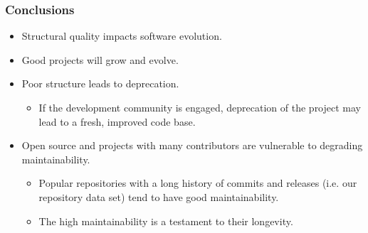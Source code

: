 \documentclass{beamer}
\begin{document}


\begin{frame}
  \frametitle{Conclusions}
  \begin{itemize}
    \item Structural quality impacts software evolution.
    
    \vspace{0.35cm}
    \item Good projects will grow and evolve.
    
    \vspace{0.35cm}
    \item Poor structure leads to deprecation.
    \begin{itemize}
      \item If the development community is engaged, deprecation of 
        \newline the project may lead to a fresh, improved code base.
    \end{itemize}
    
    \vspace{0.35cm}
    \item Open source and projects with many contributors are vulnerable to degrading maintainability.
    \begin{itemize}
      \item Popular repositories with a long history of commits and releases 
        \newline (i.e. our repository data set) tend to have good maintainability.
      \item The high maintainability is a testament to their longevity.
    \end{itemize}
  \end{itemize}
\end{frame}
\end{document}
